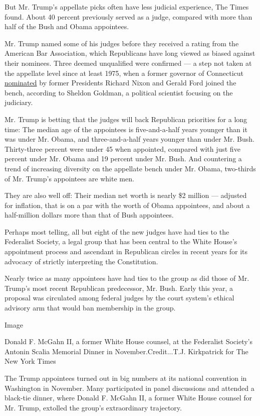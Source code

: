 But Mr. Trump's appellate picks often have less judicial experience, The
Times found. About 40 percent previously served as a judge, compared
with more than half of the Bush and Obama appointees.

Mr. Trump named some of his judges before they received a rating from
the American Bar Association, which Republicans have long viewed as
biased against their nominees. Three deemed unqualified were confirmed
--- a step not taken at the appellate level since at least 1975, when a
former governor of Connecticut
\href{https://timesmachine.nytimes3xbfgragh.onion/timesmachine/1975/03/22/92190255.html?pageNumber=20}{nominated}
by former Presidents Richard Nixon and Gerald Ford joined the bench,
according to Sheldon Goldman, a political scientist focusing on the
judiciary.

Mr. Trump is betting that the judges will back Republican priorities for
a long time: The median age of the appointees is five-and-a-half years
younger than it was under Mr. Obama, and three-and-a-half years younger
than under Mr. Bush. Thirty-three percent were under 45 when appointed,
compared with just five percent under Mr. Obama and 19 percent under Mr.
Bush. And countering a trend of increasing diversity on the appellate
bench under Mr. Obama, two-thirds of Mr. Trump's appointees are white
men.

They are also well off: Their median net worth is nearly \$2 million ---
adjusted for inflation, that is on a par with the worth of Obama
appointees, and about a half-million dollars more than that of Bush
appointees.

Perhaps most telling, all but eight of the new judges have had ties to
the Federalist Society, a legal group that has been central to the White
House's appointment process and ascendant in Republican circles in
recent years for its advocacy of strictly interpreting the Constitution.

Nearly twice as many appointees have had ties to the group as did those
of Mr. Trump's most recent Republican predecessor, Mr. Bush. Early this
year, a proposal was circulated among federal judges by the court
system's ethical advisory arm that would ban membership in the group.

Image

Donald F. McGahn II, a former White House counsel, at the Federalist
Society's Antonin Scalia Memorial Dinner in November.Credit...T.J.
Kirkpatrick for The New York Times

The Trump appointees turned out in big numbers at its national
convention in Washington in November. Many participated in panel
discussions and attended a black-tie dinner, where Donald F. McGahn II,
a former White House counsel for Mr. Trump, extolled the group's
extraordinary trajectory.

